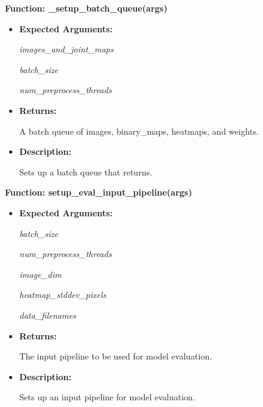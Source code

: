 \documentclass{scrreprt}
\begin{document}
\textbf{Function: \_setup\_batch\_queue(args)}
\begin{itemize}
    \item \textbf{Expected Arguments:}

            \quad\textit{images\_and\_joint\_maps}

            \quad\textit{batch\_size}

            \quad\textit{num\_preprocess\_threads}

    \item \textbf{Returns:}

            A batch queue of images, binary\_maps, heatmaps, and weights.

    \item \textbf{Description:}

            Sets up a batch queue that returns.

\end{itemize}

\textbf{Function: setup\_eval\_input\_pipeline(args)}
\begin{itemize}
    \item \textbf{Expected Arguments:}

            \quad\textit{batch\_size}

            \quad\textit{num\_preprocess\_threads}

            \quad\textit{image\_dim}

            \quad\textit{heatmap\_stddev\_pixels}

            \quad\textit{data\_filenames}

    \item \textbf{Returns:}

            The input pipeline to be used for model evaluation.

    \item \textbf{Description:}

            Sets up an input pipeline for model evaluation.
\end{itemize}
\end{document}
